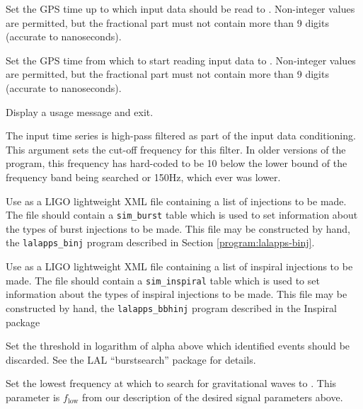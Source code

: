 \begin{entry}
\begin{entry}
\item[\option{--gps-end-time} \parm{seconds}]
Set the GPS time up to which input data should be read to .
Non-integer values are permitted, but the fractional part must not contain
more than 9 digits (accurate to nanoseconds).

\item[\option{--gps-start-time} \parm{seconds}]
Set the GPS time from which to start reading input data to .
Non-integer values are permitted, but the fractional part must not contain
more than 9 digits (accurate to nanoseconds).

\item[\option{--help}]
Display a usage message and exit.

\item[\option{--high-pass} \parm{Hz}]
The input time series is high-pass filtered as part of the input data
conditioning.  This argument sets the cut-off frequency for this filter.
In older versions of the program, this frequency has hard-coded to be
\unit{10}{\hertz} below the lower bound of the frequency band being
searched or \unit{150}{Hz}, which ever was lower.

\item[\option{--burstinjection-file} \parm{file name}]
Use  as a LIGO lightweight XML file containing a list of
injections to be made.   The file should contain a \verb+sim_burst+ table
which is used to set information about the types of burst injections to be made.
This file may be constructed by hand, the
\verb+lalapps_binj+ program described in Section
\ref{program:lalapps-binj}.

\item[\option{--inspiralinjection-file} \parm{file name}]
Use  as a LIGO lightweight XML file containing a list of inspiral
injections to be made.   The file should contain a \verb+sim_inspiral+ table
which is used to set information about the types of inspiral injections to be made.
This file may be constructed by hand, the
\verb+lalapps_bbhinj+ program described in the Inspiral package   

\item[\option{--lnthreshold} \parm{threshold}]
Set the threshold in logarithm of alpha above which identified events
should be discarded.  See the LAL ``burstsearch'' package for details.

\item[\option{--low-freq-cutoff} \parm{Hz}]
Set the lowest frequency at which to search for gravitational waves to
.  This parameter is $f_{\mathrm{low}}$ from our description of
the desired signal parameters above.


\end{entry}
\end{entry}
